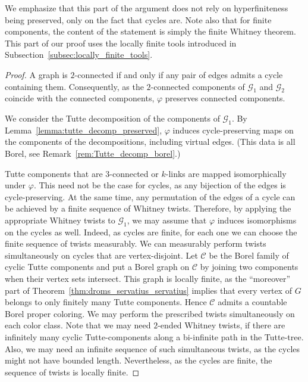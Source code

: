 \documentclass{article}
\theoremstyle{plain}
\theoremstyle{definition}
\newcommand{\cG}{\mathcal{G}}
\newcommand{\mC}{\mathscr C}
\begin{document}
We emphasize that this part of the argument does not rely on hyperfiniteness being preserved, only on the fact that cycles are. Note also that for finite components, the content of the statement is simply the finite Whitney theorem. This part of our proof uses the locally finite tools introduced in Subsection~\ref{subsec:locally_finite_tools}.

\begin{proof}
    A graph is $2$-connected if and only if any pair of edges admits a cycle containing them. Consequently, as the $2$-connected components of $\cG_1$ and $\cG_2$ coincide with the connected components, $\varphi$ preserves connected components.

    We consider the Tutte decomposition of the components of $\cG_1$. By Lemma~\ref{lemma:tutte_decomp_preserved}, $\varphi$ induces cycle-preserving maps on the components of the decompositions, including virtual edges. (This data is all Borel, see Remark~\ref{rem:Tutte_decomp_borel}.)
    
    Tutte components that are $3$-connected or $k$-links are mapped isomorphically under $\varphi$. This need not be the case for cycles, as any bijection of the edges is cycle-preserving. At the same time, any permutation of the edges of a cycle can be achieved by a finite sequence of Whitney twists. Therefore, by applying the appropriate Whitney twists to $\cG_1$, we may assume that $\varphi$ induces isomorphisms on the cycles as well. Indeed, as cycles are finite, for each one we can choose the finite sequence of twists measurably. We can measurably perform twists simultaneously on cycles that are vertex-disjoint. Let \(\mC\) be the Borel family of cyclic Tutte components and put a Borel graph on \(\mC\) by joining two components when their vertex sets intersect. This graph is locally finite, as the ``moreover'' part of Theorem~\ref{thm:droms_servatius_servatius} implies that every vertex of \(G\) belongs to only finitely many Tutte components. Hence \(\mC\) admits a countable Borel proper coloring. We may perform the prescribed twists simultaneously on each color class. Note that we may need $2$-ended Whitney twists, if there are infinitely many cyclic Tutte-components along a bi-infinite path in the Tutte-tree. Also, we may need an infinite sequence of such simultaneous twists, as the cycles might not have bounded length. Nevertheless, as the cycles are finite, the sequence of twists is locally finite.
    

\end{proof}
\end{document}
